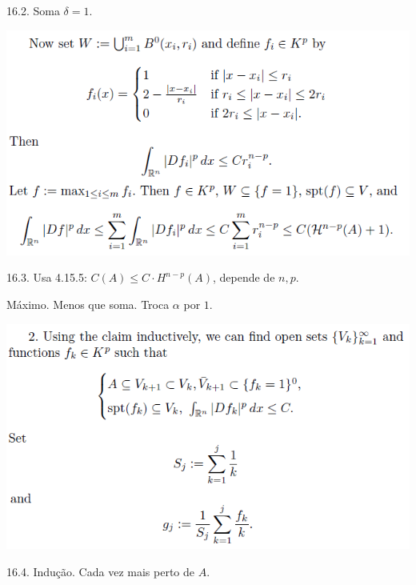 \documentclass[12pt]{article}
\begin{document}
16.2. Soma $\delta = 1$.

\vspace{300mm}

		\begin{center}
		\includegraphics{19}
		\end{center}

16.3. Usa 4.15.5: $C(A) \le C\cdot H^{n-p}(A)$, depende de $n, p$.

M\'aximo. Menos que soma. Troca $\alpha$ por $1$.

\vspace{300mm}

		\begin{center}
		\includegraphics{19b}
		\end{center}

16.4. Indu\c{c}\~ao. Cada vez mais perto de $A$.

\vspace{300mm}
\end{document}
